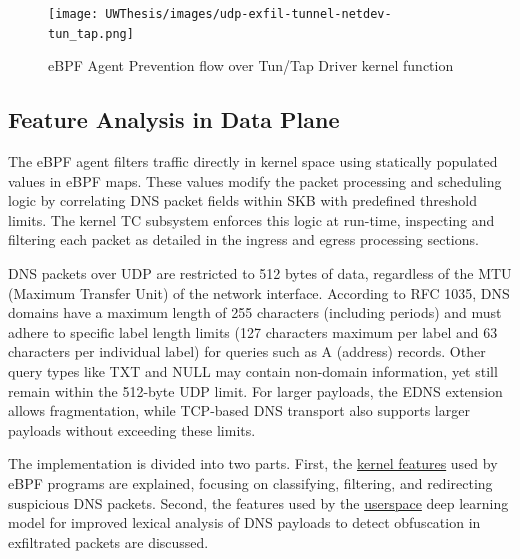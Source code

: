 \documentclass [11pt, proquest] {uwthesis}[2020/02/24]
\begin{document}
\begin{figure}[H]
\texttt{[image: UWThesis/images/udp-exfil-tunnel-netdev-tun\_tap.png]}
\caption{eBPF Agent Prevention flow over Tun/Tap Driver kernel function}
\label{sec:data_plane_tunnel_netdev}
\end{figure}



\subsection{Feature Analysis in Data Plane}
\label{sec:features}
The eBPF agent filters traffic directly in kernel space using statically populated values in eBPF maps. These values modify the packet processing and scheduling logic by correlating DNS packet fields within SKB with predefined threshold limits. The kernel TC subsystem enforces this logic at run-time, inspecting and filtering each packet as detailed in the ingress and egress processing sections.

DNS packets over UDP are restricted to 512 bytes of data, regardless of the MTU (Maximum Transfer Unit) of the network interface. According to RFC 1035, DNS domains have a maximum length of 255 characters (including periods) and must adhere to specific label length limits (127 characters maximum per label and 63 characters per individual label) for queries such as A (address) records. Other query types like TXT and NULL may contain non-domain information, yet still remain within the 512-byte UDP limit. For larger payloads, the EDNS extension allows fragmentation, while TCP-based DNS transport also supports larger payloads without exceeding these limits.

The implementation is divided into two parts. First, the \hyperref[sec:kernel-features]{kernel features} used by eBPF programs are explained, focusing on classifying, filtering, and redirecting suspicious DNS packets. Second, the features used by the \hyperref[sec:userspace-features]{userspace} deep learning model for improved lexical analysis of DNS payloads to detect obfuscation in exfiltrated packets are discussed.
\end{document}
